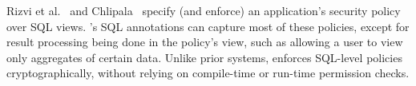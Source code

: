 Rizvi et al.~\cite{rizvi:fine-grained} and
Chlipala~\cite{chlipala:urflow} specify (and enforce) an application's
security policy over SQL views.  \name{}'s SQL annotations can capture
most of these policies, except for result processing being done in the
policy's view, such as allowing a user to view only aggregates of
certain data.  Unlike prior systems, \name{} enforces SQL-level
policies cryptographically, without relying on compile-time or
run-time permission checks.







